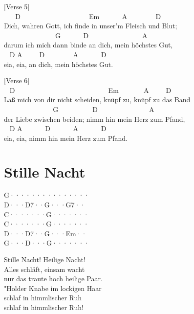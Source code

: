 \documentclass[
  letterpaper,
  twoside=false]{scrbook}
\begin{document}
{[}Verse 5{]}\\
\hspace*{0.333em} ~ ~ D ~ ~ ~ ~ ~ ~ ~ ~ ~ ~ ~ ~Em ~ ~ ~ ~A ~ ~ ~ ~ ~D\\
Dich, wahren Gott, ich finde in unser'm Fleisch und Blut;\\
\hspace*{0.333em} ~ ~ ~ ~ ~ ~ ~ ~ ~ G ~ ~ ~ ~D ~ ~ ~ ~ ~ ~ ~ ~ ~ A\\
darum ich mich dann binde an dich, mein höchstes Gut,\\
\hspace*{0.333em} ~ D A ~ ~ ~D ~ ~ ~ ~ ~A ~ ~ ~ ~D\\
eia, eia, an dich, mein höchstes Gut.

{[}Verse 6{]}\\
\hspace*{0.333em} ~ D ~ ~ ~ ~ ~ ~ ~ ~ ~ ~ ~ ~ ~ ~ ~ ~ Em ~ ~ ~ ~ A ~ ~
~D\\
Laß mich von dir nicht scheiden, knüpf zu, knüpf zu das Band\\
\hspace*{0.333em} ~ ~ ~ ~ ~ ~ ~ ~ ~G ~ ~ ~ ~ ~ ~D ~ ~ ~ ~ ~ ~ ~ ~ ~A\\
der Liebe zwischen beiden; nimm hin mein Herz zum Pfand,\\
\hspace*{0.333em} ~ D A ~ ~ ~ ~D ~ ~ ~ ~A ~ ~ ~ ~D\\
eia, eia, nimm hin mein Herz zum Pfand.

\hypertarget{stille-nacht}{%
\chapter{Stille Nacht}\label{stille-nacht}}

G···\textbar····\textbar····\textbar····\textbar{}\\
D···\textbar D7··\textbar G···\textbar G7··\textbar{}\\
C···\textbar····\textbar G···\textbar····\textbar{}\\
C···\textbar····\textbar G···\textbar····\textbar{}\\
D···\textbar D7··\textbar G···\textbar Em··\textbar{}\\
G···\textbar D···\textbar G···\textbar····\textbar{}

Stille Nacht! Heilige Nacht!\\
Alles schläft, einsam wacht\\
nur das traute hoch heilige Paar.\\
"Holder Knabe im lockigen Haar\\
schlaf in himmlischer Ruh\textquotesingle{}\\
schlaf in himmlischer Ruh\textquotesingle!
\end{document}

